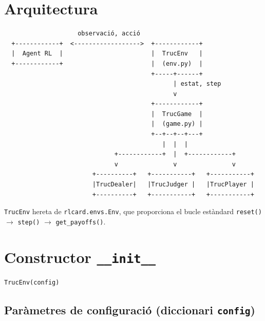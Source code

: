 \documentclass[a4paper,11pt]{report}
\begin{document}
\hrulefill

\section{Arquitectura}

\begin{verbatim}
                    observació, acció
  +------------+  <------------------>  +------------+
  |  Agent RL  |                        |  TrucEnv   |
  +------------+                        |  (env.py)  |
                                        +-----+------+
                                              | estat, step
                                              v
                                        +------------+
                                        |  TrucGame  |
                                        |  (game.py) |
                                        +--+--+--+---+
                                           |  |  |
                              +------------+  |  +------------+
                              v               v               v
                        +----------+   +-----------+   +-----------+
                        |TrucDealer|   |TrucJudger |   |TrucPlayer |
                        +----------+   +-----------+   +-----------+
\end{verbatim}

\texttt{TrucEnv} hereta de \texttt{rlcard.envs.Env}, que proporciona el bucle estàndard \texttt{reset()} $\rightarrow$ \texttt{step()} $\rightarrow$ \texttt{get\_payoffs()}.

\hrulefill

\section{Constructor \texttt{\_\_init\_\_}}

\begin{lstlisting}
TrucEnv(config)
\end{lstlisting}

\subsection{Paràmetres de configuració (diccionari \texttt{config})}
\end{document}

